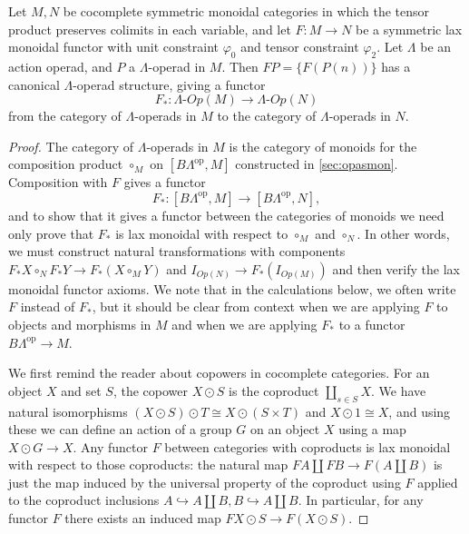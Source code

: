 \begin{thm}\label{preserveGop}
Let $M,N$ be cocomplete symmetric monoidal categories in which the tensor product preserves colimits in each variable, and let $F \colon M \rightarrow N$ be a symmetric lax monoidal functor with unit constraint $\varphi_{0}$ and tensor constraint $\varphi_{2}$. Let $\Lambda$ be an action operad, and $P$ a $\Lambda$-operad in $M$. Then $FP = \{ F(P(n)) \}$ has a canonical $\Lambda$-operad structure, giving a functor
  \[
    F_{*} \colon \Lambda\mbox{-}Op(M) \rightarrow \Lambda\mbox{-}Op(N)
  \]
from the category of $\Lambda$-operads in $M$ to the category of $\Lambda$-operads in $N$.
\end{thm}
\begin{proof}
The category of $\Lambda$-operads in $M$ is the category of monoids for the composition product $\circ_{M}$ on $[B\Lambda^{\textrm{op}}, M]$ constructed in \cref{sec:opasmon}. Composition with $F$ gives a functor
  \[
    F_{*} \colon  [B\Lambda^{\textrm{op}}, M] \rightarrow [B\Lambda^{\textrm{op}}, N],
  \]
  and to show that it gives a functor between the categories of monoids we need only prove that $F_{*}$ is lax monoidal with respect to $\circ_{M}$ and $\circ_{N}$. In other words, we must construct natural transformations with components $F_{*}X \circ_{N} F_{*}Y \rightarrow F_{*}(X \circ_{M} Y)$ and $I_{Op(N)} \rightarrow F_{*}(I_{Op(M)})$ and then verify the lax monoidal functor axioms. We note that in the calculations below, we often write $F$ instead of $F_{*}$, but it should be clear from context when we are applying $F$ to objects and morphisms in $M$ and when we are applying $F_{*}$ to a functor $ B\Lambda^{\textrm{op}} \rightarrow M$.

We first remind the reader about copowers in cocomplete categories. For an object $X$ and set $S$, the copower $X \odot S$ is the coproduct $\coprod_{s \in S} X$. We have natural isomorphisms $(X \odot S) \odot T \cong X \odot (S \times T)$ and $X \odot 1 \cong X$, and using these we can define an action of a group $G$ on an object $X$ using a map $X \odot G \rightarrow X$. Any functor $F$ between categories with coproducts is lax monoidal with respect to those coproducts:  the natural map $FA \coprod FB \rightarrow F(A \coprod B)$ is just the map induced by the universal property of the coproduct using $F$ applied to the coproduct inclusions $A \hookrightarrow A \coprod B, B \hookrightarrow A \coprod B$. In particular, for any functor $F$ there exists an induced map $FX \odot S \rightarrow F(X \odot S)$.


\end{proof}
